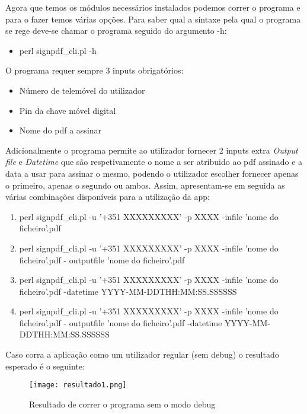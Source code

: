 Agora que temos os módulos necessários instalados podemos correr o programa e para  o fazer temos várias opções. Para saber qual a sintaxe pela qual o programa se rege deve-se chamar o programa seguido do argumento -h:
\begin{itemize}
	\item perl signpdf\_cli.pl -h
\end{itemize} 
\hfill\newline
O programa requer sempre 3 inputs obrigatórios:
\begin{itemize}
	\item Número de telemóvel do utilizador
	\item Pin da chave móvel digital
	\item Nome do pdf a assinar
\end{itemize}
\hfill\newline
Adicionalmente o programa permite ao utilizador fornecer 2 inputs extra \textit{Output file} e \textit{Datetime} que são respetivamente o nome a ser atribuido ao pdf assinado e a data a usar para assinar o mesmo, podendo o utilizador escolher fornecer apenas o primeiro, apenas o segundo ou ambos.\newline
Assim, apresentam-se em seguida as várias combinações disponíveis para a utilização da app:
\begin{enumerate}
	\item perl signpdf\_cli.pl -u '+351 XXXXXXXXX' -p XXXX -infile 'nome do ficheiro'.pdf
	\item perl signpdf\_cli.pl -u '+351 XXXXXXXXX' -p XXXX -infile 'nome do ficheiro'.pdf - outputfile 'nome do ficheiro'.pdf
	\item perl signpdf\_cli.pl -u '+351 XXXXXXXXX' -p XXXX -infile 'nome do ficheiro'.pdf -datetime YYYY-MM-DDTHH:MM:SS.SSSSSS
	\item perl signpdf\_cli.pl -u '+351 XXXXXXXXX' -p XXXX -infile 'nome do ficheiro'.pdf - outputfile 'nome do ficheiro'.pdf -datetime YYYY-MM-DDTHH:MM:SS.SSSSSS
\end{enumerate}


Caso corra a aplicação como um utilizador regular (sem debug) o resultado esperado é o seguinte:
\begin{figure}[H]

  \centering
  \captionsetup{justification=centering}

  \texttt{[image: resultado1.png]}
  
  \caption {Resultado de correr o programa sem o modo debug}

\end{figure}


